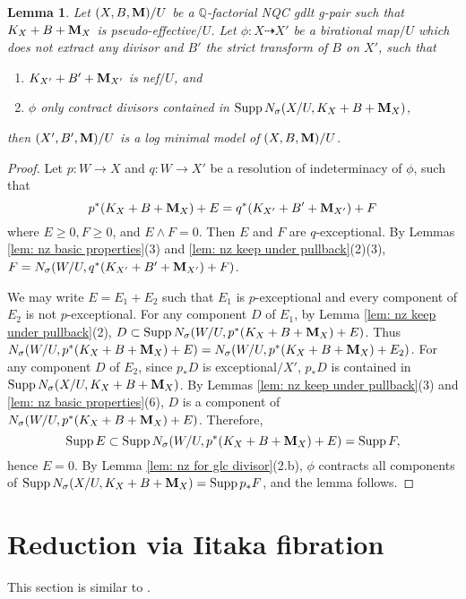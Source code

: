 \documentclass[11pt]{amsart}
\numberwithin{equation}{section}
\newcommand{\Mm}{{\bf{M}}}
\newcommand{\Qq}{\mathbb{Q}}
\newcommand{\Supp}{\operatorname{Supp}}
\newtheorem{lem}[thm]{Lemma}
\theoremstyle{definition}
\theoremstyle{definition}
\theoremstyle{definition}
\begin{document}
\begin{lem}\label{lem: hmx18 2.7.3 gpair rel}
Let $(X,B,\Mm)/U$ be a $\Qq$-factorial NQC gdlt g-pair such that $K_X+B+\Mm_X$ is pseudo-effective$/U$. Let $\phi: X\dashrightarrow X'$ be a birational map$/U$ which does not extract any divisor and $B'$ the strict transform of $B$ on $X'$, such that
\begin{enumerate}
\item $K_{X'}+B'+\Mm_{X'}$ is nef$/U$, and
\item $\phi$ only contract divisors contained in $\Supp N_{\sigma}(X/U,K_X+B+\Mm_X)$,
\end{enumerate}
then $(X',B',\Mm)/U$ is a log minimal model of $(X,B,\Mm)/U$.
\end{lem}
\begin{proof}
Let $p: W\rightarrow X$ and $q: W\rightarrow X'$ be a resolution of indeterminacy of $\phi$, such that
$$p^*(K_X+B+\Mm_X)+E=q^*(K_{X'}+B'+\Mm_{X'})+F$$
where $E\geq 0,F\geq 0$, and $E\wedge F=0$. Then $E$ and $F$ are $q$-exceptional. By Lemmas \ref{lem: nz basic properties}(3) and \ref{lem: nz keep under pullback}(2)(3), $F=N_{\sigma}(W/U,q^*(K_{X'}+B'+\Mm_{X'})+F)$. 

We may write $E=E_1+E_2$ such that $E_1$ is $p$-exceptional and every component of $E_2$ is not $p$-exceptional. For any component $D$ of $E_1$, by Lemma \ref{lem: nz keep under pullback}(2), $D\subset\Supp N_{\sigma}(W/U,p^*(K_X+B+\Mm_X)+E)$. Thus $N_{\sigma}(W/U,p^*(K_X+B+\Mm_X)+E)=N_{\sigma}(W/U,p^*(K_X+B+\Mm_X)+E_2)$.  For any component $D$ of $E_2$, since $p_*D$ is exceptional$/X'$, $p_*D$ is contained in $\Supp N_{\sigma}(X/U,K_X+B+\Mm_X)$. By Lemmas \ref{lem: nz keep under pullback}(3) and \ref{lem: nz basic properties}(6), $D$ is a component of $N_{\sigma}(W/U,p^*(K_X+B+\Mm_X)+E)$. Therefore, $$\Supp E\subset\Supp N_{\sigma}(W/U,p^*(K_X+B+\Mm_X)+E)=\Supp F,$$
hence $E=0$. By Lemma \ref{lem: nz for glc divisor}(2.b), $\phi$ contracts all components of $\Supp N_{\sigma}(X/U,K_X+B+\Mm_X)=\Supp p_*F$, and the lemma follows.
\end{proof}


\section{Reduction via Iitaka fibration}

This section is similar to \cite[Version 2, Section 4]{HL21}.
\end{document}
